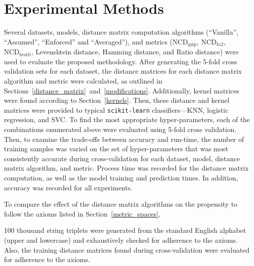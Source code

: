 \documentclass[preprint,12pt]{article}
\begin{document}







\section{Experimental Methods}
\label{methods}

Several datasets, models, distance matrix computation algorithms (``Vanilla'', ``Assumed'', ``Enforced'' and ``Averaged''), and metrics ($\text{NCD}_{\text{gzip}}$, $\text{NCD}_{bz2}$, $\text{NCD}_{brotli}$, Levenshtein distance, Hamming distance, and Ratio distance) were used to evaluate the proposed methodology.
After generating the 5-fold cross validation sets for each dataset, the distance matrices for each distance matrix algorithm and metric were calculated, as outlined in Sections~\ref{distance_matrix}~and~\ref{modifications}.
Additionally, kernel matrices were found according to Section~\ref{kernels}.
Then, these distance and kernel matrices were provided to typical \texttt{scikit-learn} classifiers---KNN, logistic regression, and SVC.
To find the most appropriate hyper-parameters, each of the combinations enumerated above were evaluated using 5-fold cross validation. 
Then, to examine the trade-offs between accuracy and run-time, the number of training samples was varied on the set of hyper-parameters that was most consistently accurate during cross-validation for each dataset, model, distance matrix algorithm, and metric.
Process time was recorded for the distance matrix computation, as well as the model training and prediction times.
In addition, accuracy was recorded for all experiments.

To compare the effect of the distance matrix algorithms on the propensity to follow the axioms listed in Section~\ref{metric_spaces},

100 thousand string triplets were generated from the standard English alphabet (upper and lowercase) and exhaustively checked for adherence to the axioms.
Also, the training distance matrices found during cross-validation were evaluated for adherence to the axioms.
\end{document}

